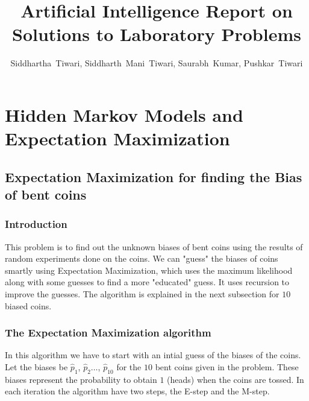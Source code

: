 \documentclass[journal, compsoc]{IEEEtran}
\title{Artificial Intelligence Report on Solutions to Laboratory Problems}
\author{Siddhartha~Tiwari, Siddharth~Mani~Tiwari, Saurabh~Kumar, Pushkar~Tiwari}
\begin{document}
\maketitle

\section{Hidden Markov Models and Expectation Maximization}
\subsection{Expectation Maximization for finding the Bias of bent coins}
\subsubsection{Introduction}
This problem is to find out the unknown biases of bent coins using the results of random experiments done on the coins.
We can "guess" the biases of coins smartly using Expectation Maximization, which uses the maximum likelihood along with some guesses
to find a more "educated" guess. It uses recursion to improve the guesses. The algorithm is explained in the next subsection for $10$ biased coins.
\subsubsection{The Expectation Maximization algorithm}
In this algorithm we have to start with an intial guess of the biases of the coins. Let the biases be $\hat{p}_{1}$, $\hat{p}_{2} \ldots$, $\hat{p}_{10}$ for the $10$
bent coins given in the problem. These biases represent the probability to obtain $1$ (heads) when the coins are tossed. In each iteration the algorithm
have two steps, the E-step and the M-step.
\end{document}
